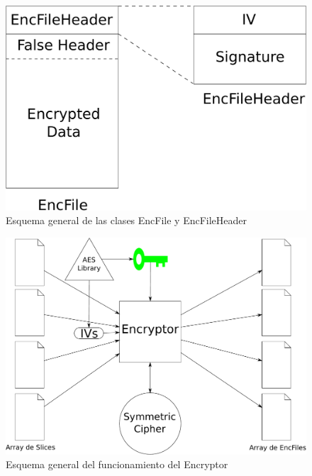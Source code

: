 \begin{figure}[ht]
  \centering
  \includegraphics[scale=0.4]{Figures/EncFile_Header}
  \decoRule
  \caption[EncFile - EncFileHeader]{Esquema general de las clases EncFile y EncFileHeader}
  \label{fig:EncFile_Header}
\end{figure}

\begin{figure}[ht]
  \centering
  \includegraphics[scale=0.5]{Figures/Encryptor}
  \decoRule
  \caption[Encryptor]{Esquema general del funcionamiento del Encryptor}
  \label{fig:Encryptor}
\end{figure}


